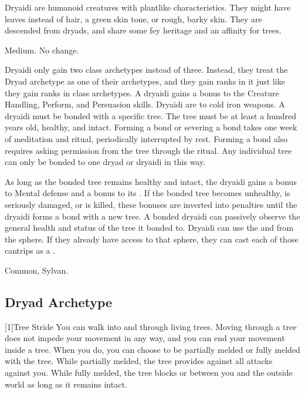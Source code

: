     Dryaidi are humanoid creatures with plantlike characteristics.
    They might have leaves instead of hair, a green skin tone, or rough, barky skin.
    They are descended from dryads, and share some fey heritage and an affinity for trees.

     Medium.
     No change.
    \begin{itemize}
         Dryaidi only gain two class archetypes instead of three.
            Instead, they treat the Dryad archetype as one of their archetypes, and they gain ranks in it just like they gain ranks in class archetypes.
         A dryaidi gains a  bonus to the Creature Handling, Perform, and Persuasion skills.
         Dryaidi are \vulnerable to cold iron weapons.
         A dryaidi must be bonded with a specific tree.
        The tree must be at least a hundred years old, healthy, and intact.
        Forming a bond or severing a bond takes one week of meditation and ritual, periodically interrupted by rest.
        Forming a bond also requires asking permission from the tree through the ritual.
        Any individual tree can only be bonded to one dryad or dryaidi in this way.

        As long as the bonded tree remains healthy and intact, the dryaidi gains a  bonus to Mental defense and a  bonus to its .
        If the bonded tree becomes unhealthy, is seriously damaged, or is killed, these bonuses are inverted into penalties until the dryaidi forms a bond with a new tree.
        A bonded dryaidi can passively observe the general health and status of the tree it bonded to.
         Dryaidi can use the  and   from the  sphere.
        If they already have access to that sphere, they can cast each of those cantrips as a .
    \end{itemize}
     Common, Sylvan.

    \subsection{Dryad Archetype}

        [1]{Tree Stride} You can walk into and through living trees.
        Moving through a tree does not impede your movement in any way, and you can end your movement inside a tree.
        When you do, you can choose to be partially melded or fully melded with the tree.
        While partially melded, the tree provides  against all attacks against you.
        While fully melded, the tree blocks  or  between you and the outside world as long as it remains intact.

